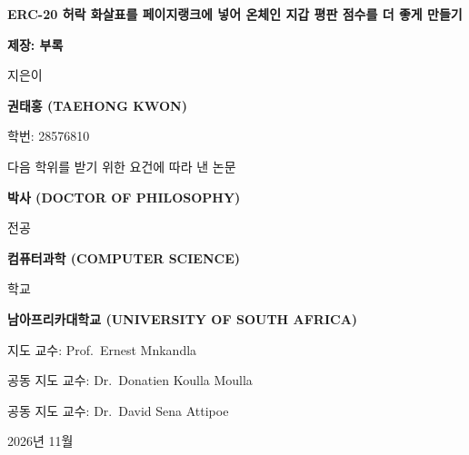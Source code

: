 \ifcase\ChapterOnly\relax
\or
  \def\ChapterCoverTitle{서론과 연구 문제}%
\or
  \def\ChapterCoverTitle{앞선 연구 살펴보기와 이론의 틀}%
\or
  \def\ChapterCoverTitle{연구 방법}%
\or
  \def\ChapterCoverTitle{구현과 실증 결과}%
\or
  \def\ChapterCoverTitle{논의}%
\or
  \def\ChapterCoverTitle{결론과 앞으로 할 일}%
\or
  \def\ChapterCoverTitle{참고문헌}%
\or
  \def\ChapterCoverTitle{부록}%
\fi

\begin{titlepage}
\centering
\vspace*{0.4cm}
{\Large\bfseries ERC-20 허락 화살표를 페이지랭크에 넣어 온체인 지갑 평판 점수를 더 좋게 만들기\par}
\vspace{1.2cm}
{\large\bfseries 제\ChapterOnly 장: \ChapterCoverTitle\par}
\vfill
{지은이\par}
\vspace{0.7cm}
{\large\bfseries 권태홍 (TAEHONG KWON)\par}
\vspace{0.35cm}
{학번: 28576810\par}
\vfill
{다음 학위를 받기 위한 요건에 따라 낸 논문\par}
\vspace{0.7cm}
{\large\bfseries 박사 (DOCTOR OF PHILOSOPHY)\par}
\vspace{0.35cm}
{전공\par}
\vspace{0.7cm}
{\large\bfseries 컴퓨터과학 (COMPUTER SCIENCE)\par}
\vfill
{학교\par}
\vspace{0.7cm}
{\large\bfseries 남아프리카대학교 (UNIVERSITY OF SOUTH AFRICA)\par}
\vfill
{지도 교수: Prof.~Ernest Mnkandla\par}
\vspace{0.35cm}
{공동 지도 교수: Dr.~Donatien Koulla Moulla\par}
\vspace{0.35cm}
{공동 지도 교수: Dr.~David Sena Attipoe\par}
\vfill
{2026년 11월\par}
\end{titlepage}
\restoregeometry
\ifdefined\ChapterStartPage
  \setcounter{page}{\ChapterStartPage}%
\fi
